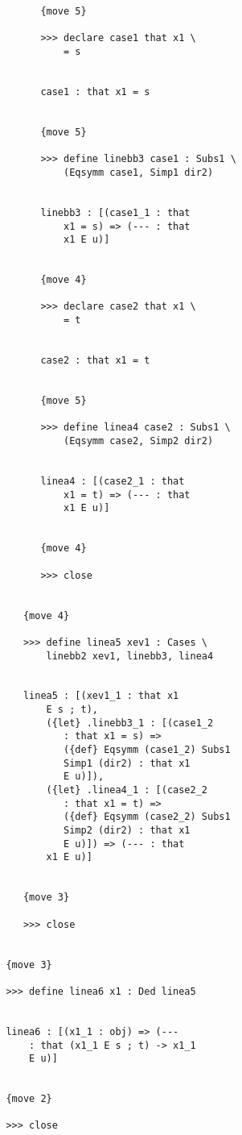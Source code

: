 \documentclass[12pt]{article}
\begin{document}
\begin{verbatim}
               {move 5}

               >>> declare case1 that x1 \
                   = s


               case1 : that x1 = s


               {move 5}

               >>> define linebb3 case1 : Subs1 \
                   (Eqsymm case1, Simp1 dir2)


               linebb3 : [(case1_1 : that 
                   x1 = s) => (--- : that 
                   x1 E u)]


               {move 4}

               >>> declare case2 that x1 \
                   = t


               case2 : that x1 = t


               {move 5}

               >>> define linea4 case2 : Subs1 \
                   (Eqsymm case2, Simp2 dir2)


               linea4 : [(case2_1 : that 
                   x1 = t) => (--- : that 
                   x1 E u)]


               {move 4}

               >>> close


            {move 4}

            >>> define linea5 xev1 : Cases \
                linebb2 xev1, linebb3, linea4


            linea5 : [(xev1_1 : that x1 
                E s ; t), 
                ({let} .linebb3_1 : [(case1_2 
                   : that x1 = s) => 
                   ({def} Eqsymm (case1_2) Subs1 
                   Simp1 (dir2) : that x1 
                   E u)]), 
                ({let} .linea4_1 : [(case2_2 
                   : that x1 = t) => 
                   ({def} Eqsymm (case2_2) Subs1 
                   Simp2 (dir2) : that x1 
                   E u)]) => (--- : that 
                x1 E u)]


            {move 3}

            >>> close


         {move 3}

         >>> define linea6 x1 : Ded linea5


         linea6 : [(x1_1 : obj) => (--- 
             : that (x1_1 E s ; t) -> x1_1 
             E u)]


         {move 2}

         >>> close



\end{verbatim}
\end{document}
